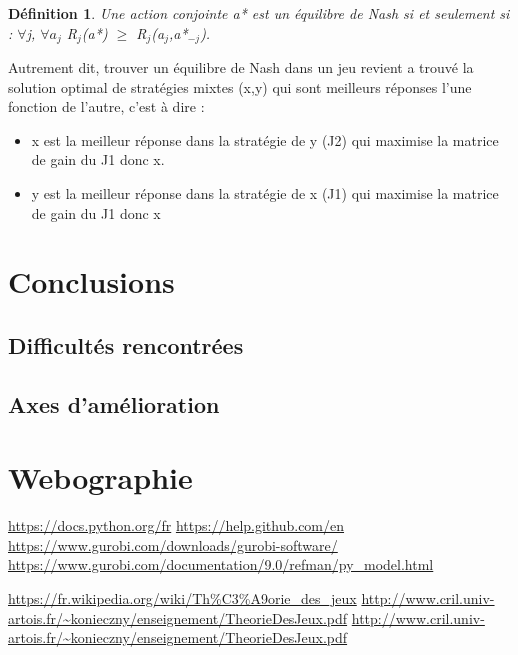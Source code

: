 \documentclass[a4paper, 12pt, twoside]{article}
\newtheorem{definition}{Définition}
\begin{document}
\begin{definition}
Une action conjointe a* est un équilibre de Nash si et seulement si : $ \forall $j, $ \forall a_{j}$ R$ _{j} $(a*) $ \geq $ R$ _{j} $(a$ _{j} $,a*$ _{-j} $).
\end{definition}
Autrement dit, trouver \textsf{un équilibre de Nash} dans un jeu revient a trouvé la solution optimal de stratégies mixtes (x,y) qui sont meilleurs réponses l'une fonction de l'autre, c'est à dire :
\begin{itemize}
\item x est la meilleur réponse dans la stratégie de y (J2) qui maximise la matrice de gain du J1 donc x.
\item y est la meilleur réponse dans la stratégie de x (J1) qui maximise la matrice de gain du J1  donc x
\end{itemize}  






\newpage
\section{Conclusions}
\subsection{Difficultés rencontrées}
\subsection{Axes d'amélioration}
\newpage
\section{Webographie}
\begin{thebibliography}{2}
    \url{https://docs.python.org/fr}\newline
   \url{https://help.github.com/en}\newline
   \url{ https://www.gurobi.com/downloads/gurobi-software/}\newline
   \url{ https://www.gurobi.com/documentation/9.0/refman/py_model.html}\newline
  
   \url{https://fr.wikipedia.org/wiki/Th\%C3\%A9orie_des_jeux}\newline
   \url{http://www.cril.univ-artois.fr/~konieczny/enseignement/TheorieDesJeux.pdf}\newline
   \url{http://www.cril.univ-artois.fr/~konieczny/enseignement/TheorieDesJeux.pdf}\newline 
\end{thebibliography}
\end{document}
